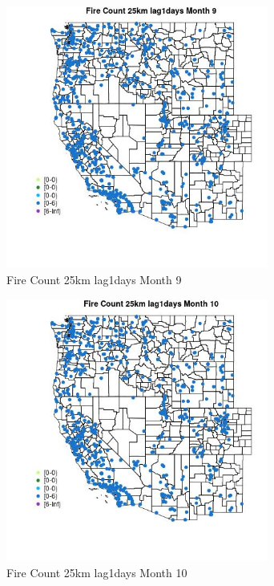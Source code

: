 \begin{figure} 
\centering  
\includegraphics[width=0.77\textwidth]{Code_Outputs/Report_ML_input_PM25_Step4_part_e_de_duplicated_aves_compiled_2019-05-21wNAs_MapObsMo9Fire_Count_25km_lag1days.jpg} 
\caption{\label{fig:Report_ML_input_PM25_Step4_part_e_de_duplicated_aves_compiled_2019-05-21wNAsMapObsMo9Fire_Count_25km_lag1days}Fire Count 25km lag1days Month 9} 
\end{figure} 
 

\clearpage 

\begin{figure} 
\centering  
\includegraphics[width=0.77\textwidth]{Code_Outputs/Report_ML_input_PM25_Step4_part_e_de_duplicated_aves_compiled_2019-05-21wNAs_MapObsMo10Fire_Count_25km_lag1days.jpg} 
\caption{\label{fig:Report_ML_input_PM25_Step4_part_e_de_duplicated_aves_compiled_2019-05-21wNAsMapObsMo10Fire_Count_25km_lag1days}Fire Count 25km lag1days Month 10} 
\end{figure} 
 

